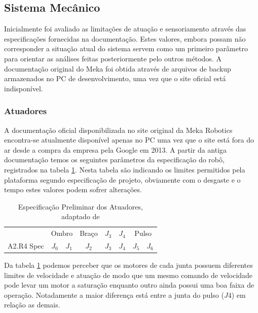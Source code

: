 \subsection{Sistema Mecânico}

Inicialmente foi avaliado as limitações de atuação e sensoriamento através das especificações fornecidas na documentação. Estes valores, embora possam não corresponder a situação atual do sistema servem como um primeiro parâmetro para orientar as análises feitas posteriormente pelo outros métodos. A documentação original do Meka foi obtida através de arquivos de backup armazenados no PC de desenvolvimento, uma vez que o site oficial está indisponível.

\subsubsection{Atuadores}

 A documentação oficial disponibilizada no site original da Meka Robotics encontra-se atualmente disponível apenas no PC uma vez que o site está fora do ar desde a compra da empresa pela Google em 2013. A partir da antiga documentação temos os seguintes parâmetros da especificação do robô, registrados na tabela \ref{tab:a2armActuationDoc}. Nesta tabela são indicando os limites permitidos pela plataforma segundo especificação de projeto, obviamente com o desgaste e o tempo estes valores podem sofrer alterações.

\begin{table}[H]
    \centering
    \caption{Especificação Preliminar dos Atuadores, adaptado de \cite{mekaguide}}
    \begin{tabular}{c|ccccccc}
         \hline
         & \multicolumn{2}{c}{Ombro} & Braço & $J_3$ & $J_4$ & \multicolumn{2}{c}{Pulso}\\
         A2.R4 Spec & $J_0$ & $J_1$ & $J_2$ & $J_3$ & $J_4$ & $J_5$ & $J_6$\\
         \hline
         
         \hline
    \end{tabular}
    \label{tab:a2armActuationDoc}
\end{table}

Da tabela \ref{tab:a2armActuationDoc} podemos perceber que os motores de cada junta possuem diferentes limites de velocidade e atuação de modo que um mesmo comando de velocidade pode levar um motor a saturação enquanto outro ainda possui uma boa faixa de operação. Notadamente a maior diferença está entre a junta do pulso ($J4$) em relação as demais.

